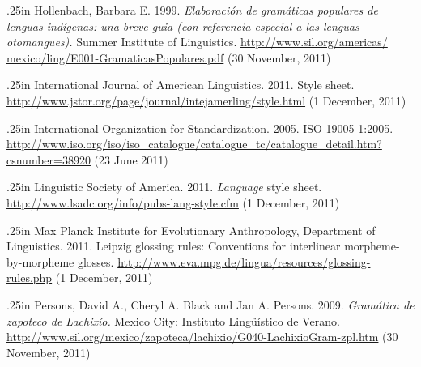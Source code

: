 \documentclass[12pt]{article}
\begin{document}
\hangindent.25in\relax
{}\relax
\fontsize{10}{12}\selectfont \protect\hypertarget{rHollenbach}{Hollenbach, Barbara E.  1999.  }\textit{Elaboración de gramáticas populares de lenguas indígenas: una breve guia (con referencia especial a las lenguas otomangues).  }Summer Institute of Linguistics.  \href{http://www.sil.org/americas/mexico/ling/E001-GramaticasPopulares.pdf}{\textcolor[rgb]{0,0,0}{http://www.sil.org/​americas/​mexico/​ling/​E001-GramaticasPopulares.pdf}}  (30 November, 2011)\par
\hangindent.25in\relax
{}\relax
\fontsize{10}{12}\selectfont \protect\hypertarget{rIJALStyleSheet}{International Journal of American Linguistics.  2011.  }Style sheet.    \href{http://www.jstor.org/page/journal/intejamerling/style.html}{\textcolor[rgb]{0,0,0}{http://www.jstor.org/​page/​journal/​intejamerling/​style.html}}  (1 December, 2011)\par
\hangindent.25in\relax
{}\relax
\fontsize{10}{12}\selectfont \protect\hypertarget{rISOPDF1.4}{International Organization for Standardization.  2005.  }ISO 19005-1:2005.    \href{http://www.iso.org/iso/iso\_catalogue/catalogue\_tc/catalogue\_detail.htm?csnumber=38920}{\textcolor[rgb]{0,0,0}{http://www.iso.org/iso/​iso\_catalogue/​catalogue\_tc/​catalogue\_detail.htm?​csnumber=38920}}  (23 June 2011)\par
\hangindent.25in\relax
{}\relax
\fontsize{10}{12}\selectfont \protect\hypertarget{rLanguageStyleSheet}{Linguistic Society of America.  2011.  }{\textit{Language}} style sheet.    \href{http://www.lsadc.org/info/pubs-lang-style.cfm}{\textcolor[rgb]{0,0,0}{http://www.lsadc.org/​info/​pubs-lang-style.cfm}}  (1 December, 2011)\par
\hangindent.25in\relax
{}\relax
\fontsize{10}{12}\selectfont \protect\hypertarget{rLeipzig}{Max Planck Institute for Evolutionary Anthropology, Department of Linguistics.  2011.  }Leipzig glossing rules: Conventions for interlinear morpheme-by-morpheme glosses.    \href{http://www.eva.mpg.de/lingua/resources/glossing-rules.php}{\textcolor[rgb]{0,0,0}{http://www.eva.mpg.de/​lingua/​resources/​glossing-rules.php}}  (1 December, 2011)\par
\hangindent.25in\relax
{}\relax
\fontsize{10}{12}\selectfont \protect\hypertarget{rPersonsBlack}{Persons, David A., Cheryl A. Black and Jan A. Persons.  2009.  }\textit{Gramática de zapoteco de Lachixío.  }Mexico City: Instituto Lingüístico de Verano.  \href{http://www.sil.org/mexico/zapoteca/lachixio/G040-LachixioGram-zpl.htm}{\textcolor[rgb]{0,0,0}{http://www.sil.org/​mexico/​zapoteca/​lachixio/​G040-LachixioGram-zpl.htm}}  (30 November, 2011)\par
\end{document}
